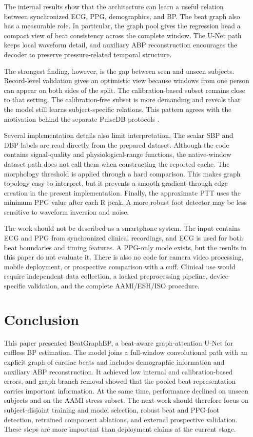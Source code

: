 \documentclass[journal,twoside,web]{ieeecolor}
\begin{document}
The internal results show that the architecture can learn a useful relation between synchronized ECG, PPG, demographics, and BP. The beat graph also has a measurable role. In particular, the graph pool gives the regression head a compact view of beat consistency across the complete window. The U-Net path keeps local waveform detail, and auxiliary ABP reconstruction encourages the decoder to preserve pressure-related temporal structure.

The strongest finding, however, is the gap between seen and unseen subjects. Record-level validation gives an optimistic view because windows from one person can appear on both sides of the split. The calibration-based subset remains close to that setting. The calibration-free subset is more demanding and reveals that the model still learns subject-specific relations. This pattern agrees with the motivation behind the separate PulseDB protocols \cite{wang2023pulsedb}.

Several implementation details also limit interpretation. The scalar SBP and DBP labels are read directly from the prepared dataset. Although the code contains signal-quality and physiological-range functions, the native-window dataset path does not call them when constructing the reported cache. The morphology threshold is applied through a hard comparison. This makes graph topology easy to interpret, but it prevents a smooth gradient through edge creation in the present implementation. Finally, the approximate PTT uses the minimum PPG value after each R peak. A more robust foot detector may be less sensitive to waveform inversion and noise.

The work should not be described as a smartphone system. The input contains ECG and PPG from synchronized clinical recordings, and ECG is used for both beat boundaries and timing features. A PPG-only mode exists, but the results in this paper do not evaluate it. There is also no code for camera video processing, mobile deployment, or prospective comparison with a cuff. Clinical use would require independent data collection, a locked preprocessing pipeline, device-specific validation, and the complete AAMI/ESH/ISO procedure.

\section{Conclusion}\label{sec:conclusion}

This paper presented BeatGraphBP, a beat-aware graph-attention U-Net for cuffless BP estimation. The model joins a full-window convolutional path with an explicit graph of cardiac beats and includes demographic information and auxiliary ABP reconstruction. It achieved low internal and calibration-based errors, and graph-branch removal showed that the pooled beat representation carries important information. At the same time, performance declined on unseen subjects and on the AAMI stress subset. The next work should therefore focus on subject-disjoint training and model selection, robust beat and PPG-foot detection, retrained component ablations, and external prospective validation. These steps are more important than deployment claims at the current stage.
\end{document}
